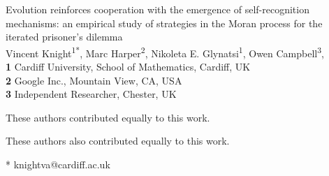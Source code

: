 \documentclass[10pt,letterpaper]{article}
\date{}
\begin{document}
\vspace*{0.2in}

\begin{flushleft}
{\Large
\textbf\newline
{Evolution reinforces cooperation with the emergence of self-recognition
 mechanisms: an empirical study of strategies in the Moran process for the
 iterated prisoner's dilemma }
}
\newline
\\
Vincent Knight\textsuperscript{1*\Yinyang},
Marc Harper\textsuperscript{2\Yinyang},
Nikoleta E. Glynatsi\textsuperscript{1\ddag},
Owen Campbell\textsuperscript{3\ddag},
\\
\bigskip
\textbf{1} Cardiff University, School of Mathematics, Cardiff, UK
\\
\textbf{2} Google Inc., Mountain View, CA, USA
\\
\textbf{3} Independent Researcher, Chester, UK
\\
\bigskip

%
%
\Yinyang These authors contributed equally to this work.

\ddag These authors also contributed equally to this work.


* knightva@cardiff.ac.uk

\end{flushleft}
\end{document}
